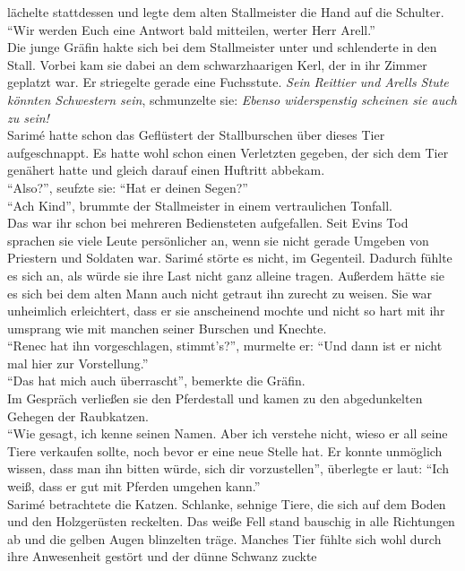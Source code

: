 lächelte stattdessen und legte dem alten Stallmeister die Hand auf die Schulter. ``Wir werden Euch 
eine Antwort bald mitteilen, werter Herr Arell.''\\
Die junge Gräfin hakte sich bei dem Stallmeister unter und schlenderte in den Stall. Vorbei kam sie 
dabei an dem schwarzhaarigen Kerl, der in ihr Zimmer geplatzt war. Er striegelte gerade eine 
Fuchsstute. \textit{Sein Reittier und Arells Stute könnten Schwestern sein}, schmunzelte sie: 
\textit{Ebenso widerspenstig scheinen sie auch zu sein!}\\
Sarimé hatte schon das Geflüstert der Stallburschen über dieses Tier aufgeschnappt. Es hatte wohl 
schon einen Verletzten gegeben, der sich dem Tier genähert hatte und gleich darauf einen Huftritt 
abbekam.\\
``Also?'', seufzte sie: ``Hat er deinen Segen?''\\
``Ach Kind'', brummte der Stallmeister in einem vertraulichen Tonfall.\\
Das war ihr schon bei mehreren Bediensteten aufgefallen. Seit Evins Tod sprachen sie viele Leute 
persönlicher an, wenn sie nicht gerade Umgeben von Priestern und Soldaten war. Sarimé störte es 
nicht, im Gegenteil. Dadurch fühlte es sich an, als würde sie ihre Last nicht ganz alleine tragen. 
Außerdem hätte sie es sich bei dem alten Mann auch nicht getraut ihn zurecht zu weisen. Sie war 
unheimlich erleichtert, dass er sie anscheinend mochte und nicht so hart mit ihr umsprang wie mit 
manchen seiner Burschen und Knechte.\\
``Renec hat ihn vorgeschlagen, stimmt's?'', murmelte er: ``Und dann ist er nicht mal hier zur
Vorstellung.''\\
``Das hat mich auch überrascht'', bemerkte die Gräfin.\\
Im Gespräch verließen sie den Pferdestall und kamen zu den abgedunkelten Gehegen der Raubkatzen.\\
``Wie gesagt, ich kenne seinen Namen. Aber ich verstehe nicht, wieso er all seine Tiere verkaufen 
sollte, noch bevor er eine neue Stelle hat. Er konnte unmöglich wissen, dass man ihn bitten würde, 
sich dir vorzustellen'', überlegte er laut: ``Ich weiß, dass er gut mit Pferden umgehen kann.''\\
Sarimé betrachtete die Katzen. Schlanke, sehnige Tiere, die sich auf dem Boden und den Holzgerüsten 
reckelten. Das weiße Fell stand bauschig in alle Richtungen ab und die gelben Augen blinzelten 
träge. Manches Tier fühlte sich wohl durch ihre Anwesenheit gestört und der dünne Schwanz zuckte 

